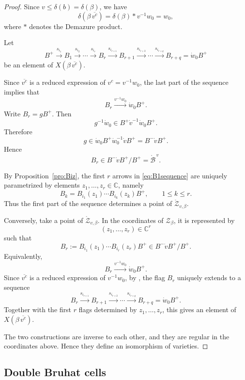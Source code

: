 \documentclass[12pt, reqno]{amsart}
\theoremstyle{plain}
\theoremstyle{definition}
\numberwithin{equation}{section}
\begin{document}
\begin{proof}
Since \(v\le \delta(b)=\delta(\beta)\), we have
\[
\delta(\beta\,\overline{v^c})
=
\delta(\beta)* v^{-1}w_0
=
w_0,
\]
where \(*\) denotes the Demazure product.

Let
\begin{equation}\label{eq:B1sequence}
B^+
\xrightarrow{s_{i_1}} B_1
\xrightarrow{s_{i_2}} \cdots
\xrightarrow{s_{i_r}} B_r
\xrightarrow{s_{i_{r+1}}} B_{r+1}
\xrightarrow{s_{i_{r+2}}} \cdots
\xrightarrow{s_{i_{r+q}}} B_{r+q}
=
\dot w_0B^+
\end{equation}
be an element of \(X(\beta\,\overline{v^c})\).

Since \(\overline{v^c}\) is a reduced expression of \(v^c=v^{-1}w_0\), the last
part of the sequence implies that
\[
B_r\xrightarrow{v^{-1}w_0}\dot w_0B^+.
\]
Write \(B_r=gB^+\). Then
\[
g^{-1}\dot w_0\in B^+\dot v^{-1}\dot w_0B^+.
\]
Therefore
\[
g\in \dot w_0B^+\dot w_0^{-1}\dot vB^+
=
B^-\dot vB^+.
\]
Hence
\[
B_r\in B^-\dot vB^+/B^+
=
\mathring{\mathcal B}^{\,v}.
\]

By Proposition~\ref{pro:Biz}, the first \(r\) arrows in
\eqref{eq:B1sequence} are uniquely parametrized by elements
\(z_1,\dots,z_r\in\mathbb C\), namely
\[
B_k=
B_{i_1}(z_1)\cdots B_{i_k}(z_k)B^+,
\qquad 1\le k\le r.
\]
Thus the first part of the sequence determines a point of
\(\mathring{\mathcal Z}_{v,\beta}\).

Conversely, take a point of \(\mathring{\mathcal Z}_{v,\beta}\). In the
coordinates of \(\mathcal Z_\beta\), it is represented by
\[
(z_1,\dots,z_r)\in\mathbb C^r
\]
such that
\[
B_r:=
B_{i_1}(z_1)\cdots B_{i_r}(z_r)B^+
\in
B^-\dot vB^+/B^+.
\]
Equivalently,
\[
B_r\xrightarrow{v^{-1}w_0}\dot w_0B^+.
\]
Since \(\overline{v^c}\) is a reduced expression of \(v^{-1}w_0\), by
\cite[Lemma~3.2]{casals2025cluster}, the flag \(B_r\) uniquely extends to a
sequence
\[
B_r
\xrightarrow{s_{i_{r+1}}} B_{r+1}
\xrightarrow{s_{i_{r+2}}} \cdots
\xrightarrow{s_{i_{r+q}}} B_{r+q}
=
\dot w_0B^+.
\]
Together with the first \(r\) flags determined by \(z_1,\dots,z_r\), this gives
an element of \(X(\beta\,\overline{v^c})\).

The two constructions are inverse to each other, and they are regular in the
coordinates above. Hence they define an isomorphism of varieties.
\end{proof}


\subsection{Double Bruhat cells}
\end{document}
